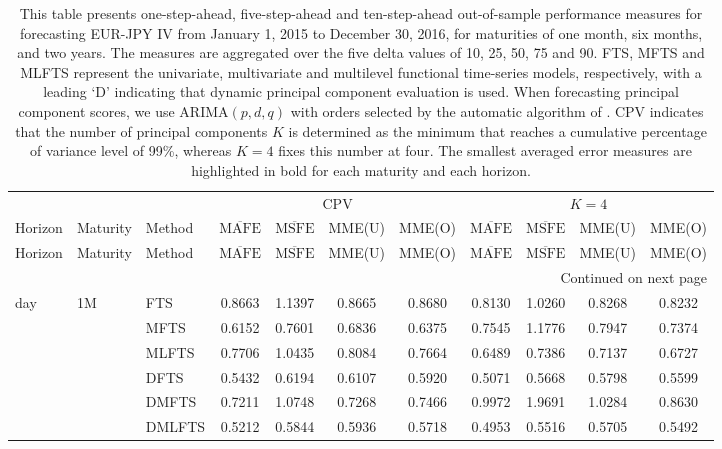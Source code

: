 \documentclass[12pt,a4paper]{article}
\begin{document}
\begin{center}
\tabcolsep 0.067in
\renewcommand{\arraystretch}{0.95}
\begin{small}
\begin{longtable}{@{}lllcccccccc@{}}
\caption{\small{This table presents one-step-ahead, five-step-ahead and ten-step-ahead out-of-sample performance measures for forecasting EUR-JPY IV from January 1, 2015 to December 30, 2016, for maturities of one month, six months, and two years. The measures are aggregated over the five delta values of 10, 25, 50, 75 and 90. FTS, MFTS and MLFTS represent the univariate, multivariate and multilevel functional time-series models, respectively, with a leading `D' indicating that dynamic principal component evaluation is used. When forecasting principal component scores, we use ARIMA$(p, d, q)$ with orders selected by the automatic algorithm of \cite{HK08}. CPV indicates that the number of principal components $K$ is determined as the minimum that reaches a cumulative percentage of variance level of 99\%, whereas $K=4$ fixes this number at four. The smallest averaged error measures are highlighted in bold for each maturity and each horizon.}}\label{tab:6}\\
\toprule
& &    & \multicolumn{4}{c}{CPV} & \multicolumn{4}{c}{$K = 4$} \\
Horizon & Maturity & Method& $\overline{\text{MAFE}}$ & $\overline{\text{MSFE}}$ & MME(U) & MME(O) & $\overline{\text{MAFE}}$ & $\overline{\text{MSFE}}$ & MME(U) & MME(O)  \\\hline
\endfirsthead
Horizon & Maturity & Method  & $\overline{\text{MAFE}}$ & $\overline{\text{MSFE}}$ & MME(U) & MME(O) & $\overline{\text{MAFE}}$ & $\overline{\text{MSFE}}$ & MME(U) & MME(O)   \\\hline
\endhead
\hline  \multicolumn{11}{r}{{Continued on next page}} \\ 
\endfoot
\endlastfoot
  1 day & 1M & FTS & 0.8663 & 1.1397 & 0.8665 & 0.8680 & 0.8130 & 1.0260 & 0.8268 & 0.8232 \\
& & MFTS & 0.6152 & 0.7601 & 0.6836 & 0.6375 & 0.7545 & 1.1776 & 0.7947 & 0.7374 \\
& & MLFTS & 0.7706 & 1.0435 & 0.8084 & 0.7664 & 0.6489 & 0.7386 & 0.7137 & 0.6727 \\
& & DFTS & 0.5432 & 0.6194 & 0.6107 & 0.5920 & 0.5071 & 0.5668 & 0.5798 & 0.5599 \\
& & DMFTS & 0.7211 & 1.0748 & 0.7268 & 0.7466 & 0.9972 & 1.9691 & 1.0284 & 0.8630 \\
& & DMLFTS & 0.5212 & 0.5844 & 0.5936 & 0.5718 & 0.4953 & 0.5516 & 0.5705 & 0.5492 \\

\end{longtable}
\end{small}
\end{center}
\end{document}
